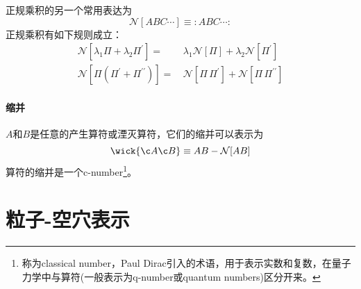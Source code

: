 正规乘积的另一个常用表达为
\begin{equation}
    \mathcal{N}[ABC\cdots] \equiv :ABC\cdots:
\end{equation}
正规乘积有如下规则成立：
\begin{align}
    \mathcal{N}\left[\lambda_1 \Pi + \lambda_2 \Pi^{\prime}\right]
    =&\, \lambda_1 \mathcal{N}[\Pi] + \lambda_2 \mathcal{N}\left[\Pi^{\prime}\right] \\
    \mathcal{N}\left[\Pi(\Pi^{\prime} + \Pi^{\prime\prime})\right]
    =&\, \mathcal{N}[\Pi\,\Pi^{\prime}] + \mathcal{N}\left[\Pi\,\Pi^{\prime\prime}\right]
\end{align}

\paragraph*{缩并}
$A$和$B$是任意的产生算符或湮灭算符，它们的缩并可以表示为
\begin{equation}
    \wick{\c A \c B} \equiv AB - \mathcal{N}[AB]
\end{equation}
算符的缩并是一个c-number\footnote{称为classical number，Paul Dirac引入的术语，用于表示实数和复数，在量子力学中与算符(一般表示为q-number或quantum numbers)区分开来。}。

\section{粒子-空穴表示}

